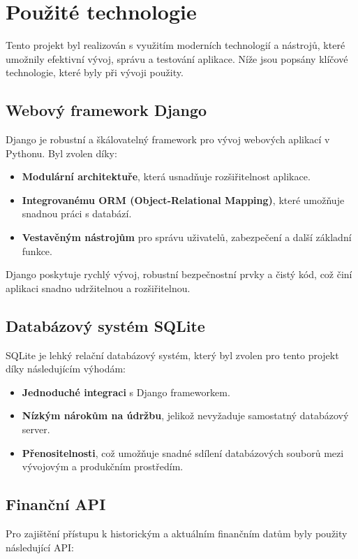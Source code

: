 \documentclass[12pt, a4paper]{report}
\begin{document}
\chapter{Použité technologie}

Tento projekt byl realizován s využitím moderních technologií a nástrojů, které umožnily efektivní vývoj, správu a testování aplikace. Níže jsou popsány klíčové technologie, které byly při vývoji použity.

\section{Webový framework Django}
Django je robustní a škálovatelný framework pro vývoj webových aplikací v Pythonu. Byl zvolen díky:
\begin{itemize}
    \item \textbf{Modulární architektuře}, která usnadňuje rozšiřitelnost aplikace.
    \item \textbf{Integrovanému ORM (Object-Relational Mapping)}, které umožňuje snadnou práci s databází.
    \item \textbf{Vestavěným nástrojům} pro správu uživatelů, zabezpečení a další základní funkce.
\end{itemize}
Django poskytuje rychlý vývoj, robustní bezpečnostní prvky a čistý kód, což činí aplikaci snadno udržitelnou a rozšiřitelnou.

\section{Databázový systém SQLite}
SQLite je lehký relační databázový systém, který byl zvolen pro tento projekt díky následujícím výhodám:
\begin{itemize}
    \item \textbf{Jednoduché integraci} s Django frameworkem.
    \item \textbf{Nízkým nárokům na údržbu}, jelikož nevyžaduje samostatný databázový server.
    \item \textbf{Přenositelnosti}, což umožňuje snadné sdílení databázových souborů mezi vývojovým a produkčním prostředím.
\end{itemize}

\section{Finanční API}
Pro zajištění přístupu k historickým a aktuálním finančním datům byly použity následující API:
\end{document}
